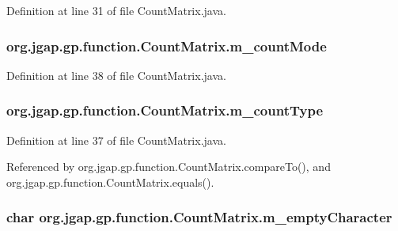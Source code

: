 Definition at line 31 of file Count\-Matrix.\-java.

\hypertarget{classorg_1_1jgap_1_1gp_1_1function_1_1_count_matrix_aa6252cd1d406acde92bd1f20e09c7c03}{
\subsubsection[{m\-\_\-count\-Mode}]{ org.\-jgap.\-gp.\-function.\-Count\-Matrix.\-m\-\_\-count\-Mode\hspace{0.3cm}{\ttfamily [private]}}}\label{classorg_1_1jgap_1_1gp_1_1function_1_1_count_matrix_aa6252cd1d406acde92bd1f20e09c7c03}


Definition at line 38 of file Count\-Matrix.\-java.

\hypertarget{classorg_1_1jgap_1_1gp_1_1function_1_1_count_matrix_a887dc3a42b519552bb175f496628473c}{
\subsubsection[{m\-\_\-count\-Type}]{ org.\-jgap.\-gp.\-function.\-Count\-Matrix.\-m\-\_\-count\-Type\hspace{0.3cm}{\ttfamily [private]}}}\label{classorg_1_1jgap_1_1gp_1_1function_1_1_count_matrix_a887dc3a42b519552bb175f496628473c}


Definition at line 37 of file Count\-Matrix.\-java.



Referenced by org.\-jgap.\-gp.\-function.\-Count\-Matrix.\-compare\-To(), and org.\-jgap.\-gp.\-function.\-Count\-Matrix.\-equals().

\hypertarget{classorg_1_1jgap_1_1gp_1_1function_1_1_count_matrix_ad70645403e114b27037ef063589d18a9}{
\subsubsection[{m\-\_\-empty\-Character}]{\setlength{\rightskip}{0pt plus 5cm}char org.\-jgap.\-gp.\-function.\-Count\-Matrix.\-m\-\_\-empty\-Character\hspace{0.3cm}{\ttfamily [private]}}}\label{classorg_1_1jgap_1_1gp_1_1function_1_1_count_matrix_ad70645403e114b27037ef063589d18a9}


